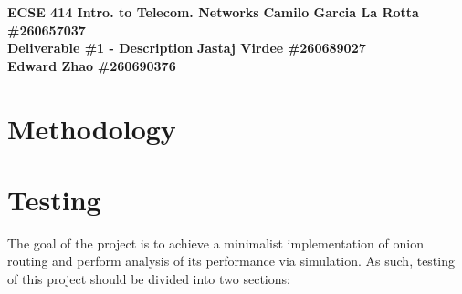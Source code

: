 \documentclass{article}
\begin{document}
\noindent
\large \textbf{ECSE 414 Intro. to Telecom. Networks} \hfill \textbf{Camilo Garcia La Rotta} \textbf{\#260657037} \\
\large \textbf{Deliverable \#1 - Description} \hfill \textbf{Jastaj Virdee} \textbf{\#260689027} \\
\text{} \hfill \textbf{Edward Zhao} \textbf{\#260690376}

\section*{Methodology}

\section*{Testing}
The goal of the project is to achieve a minimalist implementation of onion routing and perform analysis of its performance via simulation. As such, testing of this project should be divided into two sections:
\end{document}
